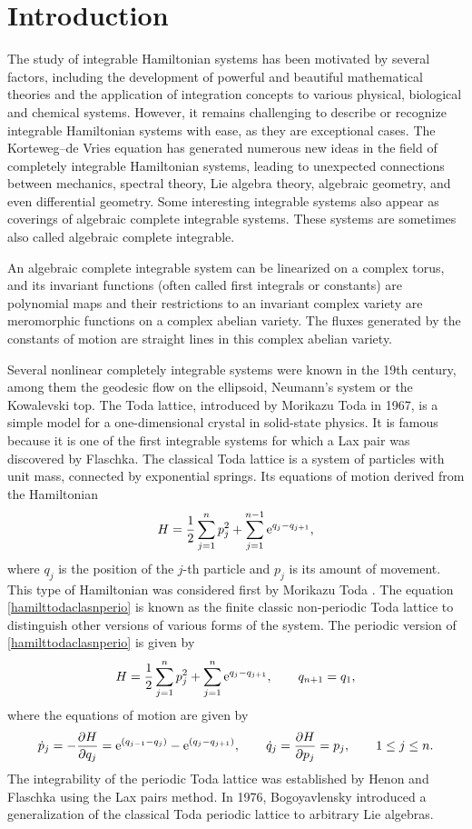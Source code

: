 \documentclass[pdftex]{sigma}
\numberwithin{equation}{section}
\begin{document}
\section{Introduction}
The study of integrable Hamiltonian systems has been motivated by
several factors, including the development of powerful and beautiful
mathematical theories and the application of integration concepts to
various physical, biological and chemical systems. However, it
remains challenging to describe or recognize integrable Hamiltonian
systems with ease, as they are exceptional cases. The Korteweg--de Vries
equation has generated numerous new ideas in the field of
completely integrable Hamiltonian systems, leading to unexpected
connections between mechanics, spectral theory, Lie algebra theory,
algebraic geometry, and even differential geometry. Some interesting
integrable systems also appear as coverings of algebraic complete
integrable systems. These systems are sometimes also called
algebraic complete integrable.

 An algebraic complete integrable system can be linearized on a complex torus, and its
invariant functions (often called first integrals or constants) are
polynomial maps and their restrictions to an invariant complex
variety are meromorphic functions on a complex abelian variety. The
fluxes generated by the constants of motion are straight lines in
this complex abelian variety.%

Several nonlinear completely integrable systems were known in the
19th century, among them the geodesic flow on the ellipsoid,
Neumann's system or the Kowalevski top. The Toda lattice, introduced
by Morikazu Toda in 1967, is a simple model for a one-dimensional
crystal in solid-state physics. It is famous because it is one of
the first integrable systems for which a Lax pair was discovered by
Flaschka. The classical Toda lattice is a system of particles with
unit mass, connected by exponential springs. Its equations of motion derived from the Hamiltonian
\begin{equation}
 H=\frac{1}{2}\sum_{j=1}^n p_j^2+ \sum_{j=1}^{n-1}
 {\rm e}^{q_j-q_{j+1}}, \label{hamilttodaclasnperio}
\end{equation}
where $q_j$ is the position of the $j$-th particle and
$p_j$ is its amount of movement. This type of Hamiltonian was
considered first by Morikazu Toda \cite{toda,toda1}. The equation
\eqref{hamilttodaclasnperio} is known as the finite classic non-periodic Toda lattice to distinguish other versions of various forms
of the system. The periodic version of \eqref{hamilttodaclasnperio}
is given by
\[H=\frac{1}{2}\sum_{j=1}^n p_j^2+ \sum_{j=1}^n {\rm e}^{q_j-q_{j+1}}, \qquad q_{n+1} =q_1,\]
 where the equations of motion are given by
\[
\dot{p}_j=-\frac{\partial H}{\partial q_j}=
{\rm e}^{(q_{j-1}-q_j)}-{\rm e}^{(q_j-q_{j+1})},\qquad \dot{q}_j=\frac{\partial H }{\partial p_j}=p_j, \qquad 1\leq j\leq n.
\]
The integrability of the periodic Toda lattice was established by
Henon \cite{henon} and Flaschka \cite{flaschka} using the Lax pairs
method. In 1976, Bogoyavlensky \cite{bogoya} introduced a
generalization of the classical Toda periodic lattice to arbitrary
Lie algebras.
\end{document}
